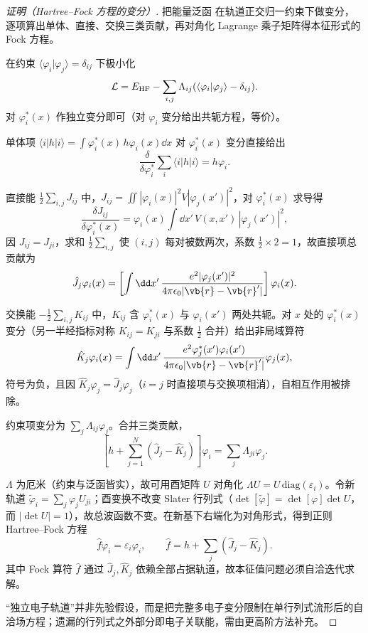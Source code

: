 \begin{proof}[证明（Hartree--Fock 方程的变分）]
把能量泛函 在轨道正交归一约束下做变分，逐项算出单体、直接、交换三类贡献，再对角化 Lagrange 乘子矩阵得本征形式的 Fock 方程。

在约束 $\langle\varphi_i|\varphi_j\rangle=\delta_{ij}$ 下极小化
\[
\mathcal L
=E_{\rm HF}
-\sum_{i,j}\Lambda_{ij}
(\langle\varphi_i|\varphi_j\rangle-\delta_{ij}).
\]
对 $\varphi_i^*(x)$ 作独立变分即可（对 $\varphi_i$ 变分给出共轭方程，等价）。

单体项 $\langle i|h|i\rangle=\int\varphi_i^*(x)\,h\varphi_i(x)\dd x$ 对 $\varphi_i^*(x)$ 变分直接给出
\begin{equation*}
 \frac{\delta}{\delta\varphi_i^*}\sum_i\langle i|h|i\rangle
 =h\varphi_i.
\end{equation*}

直接能 $\frac12\sum_{i,j}J_{ij}$ 中，$J_{ij}=\iint|\varphi_i(x)|^2V|\varphi_j(x')|^2$，对 $\varphi_i^*(x)$ 求导得
\[
\frac{\delta J_{ij}}{\delta\varphi_i^*(x)}
=\varphi_i(x)\int\dd x'\,V(x,x')\,|\varphi_j(x')|^2,
\]
因 $J_{ij}=J_{ji}$，求和 $\frac12\sum_{i,j}$ 使 $(i,j)$ 每对被数两次，系数 $\frac12\times2=1$，故直接项总贡献为
\[
\hat J_j\varphi_i(x)
=\left[
\int\dd x'\,
\frac{e^2|\varphi_j(x')|^2}
{4\pi\epsilon_0|\vb{r}-\vb{r}'|}
\right]\varphi_i(x).
\]

交换能 $-\frac12\sum_{i,j}K_{ij}$ 中，$K_{ij}$ 含 $\varphi_i^*(x)$ 与 $\varphi_i(x')$ 两处共轭。对 $x$ 处的 $\varphi_i^*(x)$ 变分（另一半经指标对称 $K_{ij}=K_{ji}$ 与系数 $\frac12$ 合并）给出非局域算符
\[
\hat K_j\varphi_i(x)
=\int\dd x'\,
\frac{e^2\varphi_j^*(x')\varphi_i(x')}
{4\pi\epsilon_0|\vb{r}-\vb{r}'|}
\varphi_j(x),
\]
符号为负，且因 $\hat K_j\varphi_j=\hat J_j\varphi_j$（$i=j$ 时直接项与交换项相消），自相互作用被排除。

约束项变分为 $\sum_{j}\Lambda_{ij}\varphi_j$。合并三类贡献，
\[
\left[h+\sum_{j=1}^{N}(\hat J_j-\hat K_j)\right]\varphi_i
=\sum_j\Lambda_{ji}\varphi_j.
\]

$\Lambda$ 为厄米（约束与泛函皆实），故可用酉矩阵 $U$ 对角化 $\Lambda U=U\,\text{diag}(\varepsilon_i)$。令新轨道 $\widetilde\varphi_i=\sum_j\varphi_j U_{ji}$；酉变换不改变 Slater 行列式（$\det[\widetilde\varphi]=\det[\varphi]\det U$，而 $|\det U|=1$），故总波函数不变。在新基下右端化为对角形式，得到正则 Hartree--Fock 方程
\begin{equation}
\hat f\varphi_i=\varepsilon_i\varphi_i,
\qquad
\hat f=h+\sum_j(\hat J_j-\hat K_j).
\label{eq:am-hf-equation}
\end{equation}
其中 Fock 算符 $\hat f$ 通过 $\hat J_j,\hat K_j$ 依赖全部占据轨道，故本征值问题必须自洽迭代求解。

“独立电子轨道”并非先验假设，而是把完整多电子变分限制在单行列式流形后的自洽场方程；遗漏的行列式之外部分即电子关联能，需由更高阶方法补充。
\end{proof}

